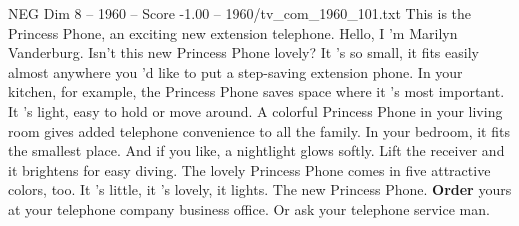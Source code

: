 \begin{textsample}{NEG Dim 8 – 1960 – Score -1.00 – 1960/tv\_com\_1960\_101.txt}  \label{ex:f8_neg_040}
This is the Princess Phone, an exciting new extension telephone.
Hello, I 'm Marilyn Vanderburg.
Isn't this new Princess Phone lovely?
It 's so small, it fits easily almost anywhere you 'd like to put a step-saving extension phone.
In your kitchen, for example, the Princess Phone saves space where it 's most important.
It 's light, easy to hold or move around.
A colorful Princess Phone in your living room gives added telephone convenience to all the family.
In your bedroom, it fits the smallest place.
And if you like, a nightlight glows softly.
Lift the receiver and it brightens for easy diving.
The lovely Princess Phone comes in five attractive colors, too.
It 's little, it 's lovely, it lights.
The new Princess Phone. \textbf{Order} yours at your telephone company business office.
Or ask your telephone service man.

\end{textsample}
